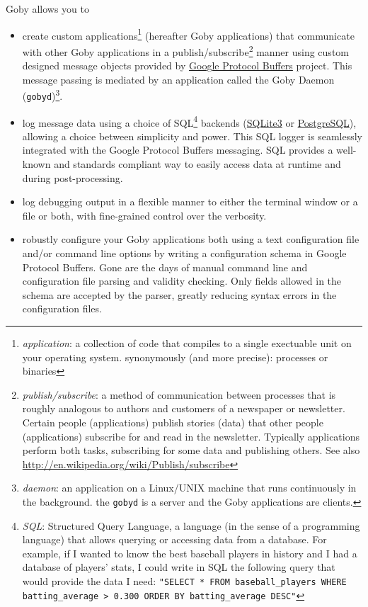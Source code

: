 \documentclass[11pt, letterpaper, oneside]{memoir}
\begin{document}
Goby allows you to
\begin{itemize}
\item create custom applications\footnote{\textit{application}: a collection of code that compiles to a single exectuable unit on your operating system. synonymously (and more precise): processes or binaries} (hereafter Goby applications) that communicate with other Goby applications in a publish/subscribe\footnote{\textit{publish/subscribe}: a method of communication between processes that is roughly analogous to authors and customers of a newspaper or newsletter. Certain people (applications) publish stories (data) that other people (applications) subscribe for and read in the newsletter. Typically applications perform both tasks, subscribing for some data and publishing others. See also \url{http://en.wikipedia.org/wiki/Publish/subscribe}} manner using custom designed message objects provided by \href{http://code.google.com/apis/protocolbuffers/}{Google Protocol Buffers} project. This message passing is mediated by an application called the Goby Daemon (\verb|gobyd|)\footnote{\textit{daemon}: an application on a Linux/UNIX machine that runs continuously in the background. the \texttt{gobyd} is a server and the Goby applications are clients.}.
\item log message data using a choice of SQL\footnote{\textit{SQL}: Structured Query Language, a language (in the sense of a programming language) that allows querying or accessing data from a database. For example, if I wanted to know the best baseball players in history and I had a database of players' stats, I could write in SQL the following query that would provide the data I need: 
\texttt{"SELECT * FROM baseball\_players WHERE batting\_average > 0.300 ORDER BY batting\_average DESC"}} backends (\href{http://www.sqlite.org/}{SQLite3} or \href{http://www.postgresql.org/}{PostgreSQL}), allowing a choice between simplicity and power. This SQL logger is seamlessly integrated with the Google Protocol Buffers messaging. SQL provides a well-known and standards compliant way to easily access data at runtime and during post-processing.
\item log debugging output in a flexible manner to either the terminal window or a file or both, with fine-grained control over the verbosity.
\item robustly configure your Goby applications both using a text configuration file and/or command line options by writing a configuration schema in Google Protocol Buffers. Gone are the days of manual command line and configuration file parsing and validity checking. Only fields allowed in the schema are accepted by the parser, greatly reducing syntax errors in the configuration files.
\end{itemize}
\end{document}

